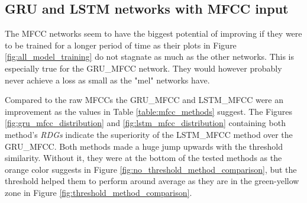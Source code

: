 \subsection{GRU and LSTM networks with MFCC input}\label{ssec:GRU_LSTM_MFCC_results}
The MFCC networks seem to have the biggest potential of improving if they were to be trained for a longer period of time as their plots in Figure \ref{fig:all_model_training} do not stagnate as much as the other networks. This is especially true for the GRU\_MFCC network. They would however probably never achieve a loss as small as the "mel" networks have. 

Compared to the raw MFCCs the GRU\_MFCC and LSTM\_MFCC were an improvement as the values in Table \ref{table:mfcc_methods} suggest. The Figures \ref{fig:gru_mfcc_distribution} and \ref{fig:lstm_mfcc_distribution} containing both method's \textit{RDGs} indicate the superiority of the LSTM\_MFCC method over the GRU\_MFCC. Both methods made a huge jump upwards with the threshold similarity. Without it, they were at the bottom of the tested methods as the orange color suggests in Figure \ref{fig:no_threshold_method_comparison}, but the threshold helped them to perform around average as they are in the green-yellow zone in Figure \ref{fig:threshold_method_comparison}.


